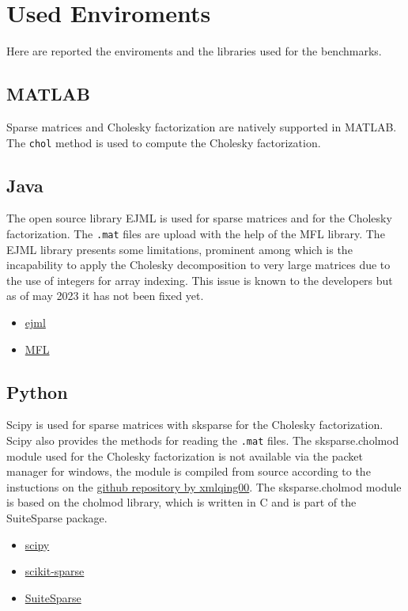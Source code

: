 \documentclass{report}
\begin{document}
    \chapter[Enviroments]{Used Enviroments}
        Here are reported the enviroments and the libraries used for the benchmarks.
        \section{MATLAB}
            Sparse matrices and Cholesky factorization are natively supported in MATLAB.
            The \texttt{chol} method is used to compute the Cholesky factorization.
        \section{Java}
            The open source library EJML is used for sparse matrices and for the Cholesky factorization.
            The \texttt{.mat} files are upload with the help of the MFL library.
            The EJML library presents some limitations, prominent among which is the incapability to apply the Cholesky decomposition to very large matrices due to the use of integers for array indexing. This issue is known to the developers but as of may 2023 it has not been fixed yet.

            \begin{itemize}
                \item \href{http://ejml.org/}{ejml}
                \item \href{https://github.com/HebiRobotics/MFL}{MFL}
            \end{itemize}
            
        \section{Python}
            Scipy is used for sparse matrices with sksparse for the Cholesky factorization.
            Scipy also provides the methods for reading the \texttt{.mat} files.
            The sksparse.cholmod module used for the Cholesky factorization is not available via the packet manager for windows, the module is compiled from source according to the instuctions on the \href{https://github.com/xmlyqing00/Cholmod-Scikit-Sparse-Windows}{github repository by xmlqing00}.
            The sksparse.cholmod module is based on the cholmod library, which is written in C and is part of the SuiteSparse package.

            \begin{itemize}
                \item \href{https://www.scipy.org/}{scipy}
                \item \href{https://github.com/scikit-sparse/scikit-sparse} {scikit-sparse}
                \item \href{http://suitesparse.com}{SuiteSparse}
            \end{itemize}
\end{document}

